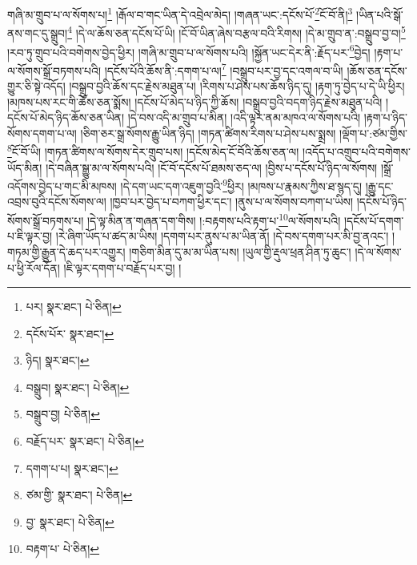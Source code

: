 གཞི་མ་གྲུབ་པ་ལ་སོགས་པ།\footnote{པར།  སྣར་ཐང་།  པེ་ཅིན། } །རྒོལ་བ་གང་ཡིན་དེ་འབྲེལ་མེད། །གཞན་ཡང་:དངོས་པོ་\footnote{དངོས་པོར་  སྣར་ཐང་། }ངོ་བོ་ནི།\footnote{ཉིད།  སྣར་ཐང་། } །ཡིན་པའི་སྒོ་ནས་གང་དུ་སྒྲུབ།\footnote{བསྒྲུབ།  སྣར་ཐང་།  པེ་ཅིན། } །དེ་ལ་ཆོས་ཅན་དངོས་པོ་ཡི། །ངོ་བོ་ཡིན་ཞེས་བརྩལ་བའི་རིགས། །དེ་མ་གྲུབ་ན་:བསྒྲུབ་བྱ་བ།\footnote{བསྒྲུབ་བྱ།  པེ་ཅིན། } །རབ་ཏུ་གྲུབ་པའི་བགེགས་བྱེད་ཕྱིར། །གཞི་མ་གྲུབ་པ་ལ་སོགས་པའི། །སྐྱོན་ཡང་དེར་ནི་:རྗོད་པར་\footnote{བརྗོད་པར་  སྣར་ཐང་།  པེ་ཅིན། }བྱེད། །རྟག་པ་ལ་སོགས་སྒྲོ་བཏགས་པའི། །དངོས་པོའི་ཆོས་ནི་:དགག་པ་ལ།\footnote{དགག་པ་པ།  སྣར་ཐང་། } །བསྒྲུབ་པར་བྱ་དང་འགལ་བ་ཡི། །ཆོས་ཅན་དངོས་གྱུར་ཅི་སྟེ་འདོད། །བསྒྲུབ་བྱའི་ཆོས་དང་རྗེས་མཐུན་པ། །རིགས་པ་ཤེས་པས་ཆོས་ཉིད་དུ། །རྟག་ཏུ་བྱེད་པ་དེ་ཡི་ཕྱིར། །མཁས་པས་རང་གི་ཆོས་ཅན་སྨོས། །དངོས་པོ་མེད་པ་ཉིད་ཀྱི་ཆོས། །བསྒྲུབ་བྱའི་བདག་ཉིད་རྗེས་མཐུན་པའི། །དངོས་པོ་མེད་ཉིད་ཆོས་ཅན་ཡིན། །དེ་བས་འདི་མ་གྲུབ་པ་མིན། །འདི་ལྟར་ནམ་མཁའ་ལ་སོགས་པའི། །རྟག་པ་ཉིད་སོགས་དགག་པ་ལ། །ཅིག་ཅར་སྒྲ་སོགས་རྒྱུ་ཡིན་ཉིད། །གཏན་ཚིགས་རིགས་པ་ཤེས་པས་སྨྲས། །ལྡོག་པ་:ཙམ་གྱིས་\footnote{ཙམ་གྱི་  སྣར་ཐང་།  པེ་ཅིན། }ངོ་བོ་ཡི། །གཏན་ཚིགས་ལ་སོགས་དེར་གྲུབ་པས། །དངོས་མེད་ངོ་བོའི་ཆོས་ཅན་ལ། །འདོད་པ་འགྲུབ་པའི་བགེགས་ཡོད་མིན། །དེ་བཞིན་སྒྱུ་མ་ལ་སོགས་པའི། །ངོ་བོ་དངོས་པོ་ཐམས་ཅད་ལ། །བྱིས་པ་དངོས་པོ་ཉིད་ལ་སོགས། །སྒྲོ་འདོགས་བྱེད་པ་གང་མི་མཁས། །དེ་དག་ཡང་དག་འཇུག་བྱའི་\footnote{བྱ་  སྣར་ཐང་།  པེ་ཅིན། }ཕྱིར། །མཁས་པ་རྣམས་ཀྱིས་ཐ་སྙད་དུ། །རྒྱུ་དང་འབྲས་བུའི་དངོས་སོགས་ལ། །ཁྱབ་པར་བྱེད་པ་བཀག་ཕྱིར་དང་། །ནུས་པ་ལ་སོགས་བཀག་པ་ཡིས། །དངོས་པོ་ཉིད་སོགས་སྒྲོ་བཏགས་པ། །དེ་ལྟ་མིན་ན་གཞན་དག་གིས། །:བརྟགས་པའི་རྟག་པ་\footnote{བརྟག་པ་  པེ་ཅིན། }ལ་སོགས་པའི། །དངོས་པོ་དགག་པ་ཇི་ལྟར་བྱ། །རེ་ཞིག་ཡོད་པ་ཚད་མ་ཡིས། །དགག་པར་ནུས་པ་མ་ཡིན་ནོ། །དེ་བས་དགག་པར་མི་བྱ་ནའང་། །གཏམ་གྱི་རྒྱུན་དེ་ཆད་པར་འགྱུར། །གཅིག་མིན་དུ་མ་མ་ཡིན་པས། །ཡུལ་གྱི་རྡུལ་ཕྲན་ཤིན་ཏུ་ཆུང་། །དེ་ལ་སོགས་པ་ཕྱི་རོལ་དོན། །ཇི་ལྟར་དགག་པ་བརྗོད་པར་བྱ། །
